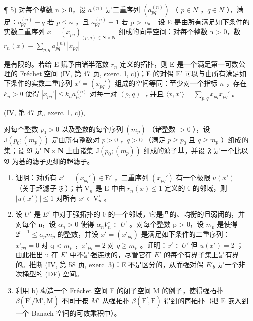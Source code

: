 ¶ 5) 对每个整数 n \textgreater{} 0，设 \(a^{(n)}\) 是二重序列 \((a_{pq}^{(n)})\) （ \(p \in N\) ，\(q \in N\) ），满足：\(a_{pq}^{(n)} = q\) 若 \(p \leqslant n\) ，且 \(a_{pq}^{(n)} = 1\) 若 p \textgreater{} n。~设 E 是由所有满足如下条件的实数二重序列 \(x = (x_{pq})_{(p,q) \in \mathbf{N} \times \mathbf{N}}\) 组成的向量空间：对每个整数 n \textgreater{} 0，数 \(r_n(x) = \sum_{p,q} a_{pq}^{(n)} |x_{pq}|\)

是有限的。若给 E 赋予由诸半范数 \(r_n\) 定义的拓扑，则 E 是一个满足第一可数公理的 Fréchet 空间 (IV, 第 47 页, exerc. 1, c))；E 的对偶 E' 可以与由所有满足如下条件的实数二重序列 \(x' = (x_{pq}')\) 组成的空间等同：至少对一个指标 \(n\) ，存在 \(k_n > 0\) 使得 \(|x_{pq}'| \leqslant k_n a_{pq}^{(n)}\) 对每一对 \((p, q)\) ；并且 \(\langle x, x' \rangle = \sum_{p, q} x_{pq} x_{pq}'\) 。

(IV, 第 47 页, exerc. 1, c))。

对每个整数 \(p_0 > 0\) 以及整数的每个序列 \((m_p)\) （诸整数 \(> 0\) ），设 \(\mathrm{J}(p_0; (m_p))\) 是由所有整数对 \(p > 0\) ，\(q > 0\) （满足 \(p \geqslant p_0\) 且 \(q \geqslant m_p\) ）组成的集；设 \(\mathfrak{V}\) 是 \(\mathbf{N} \times \mathbf{N}\) 上由诸集 \(\mathrm{J}(p_0; (m_p))\) 组成的滤子基，并设 \(\mathfrak{F}\) 是一个比以 \(\mathfrak{V}\) 为基的滤子更细的超滤子。

\begin{enumerate}
\def\labelenumi{\alph{enumi})}
\item
  证明：对所有 \(x' = (x_{pq}') \in \mathrm{E}'\) ，二重序列 \((x_{pq}')\) 有一个极限 \(u(x')\) （关于超滤子 \(\mathfrak{F}\) ）；若 \(\mathrm{V}_n\) 是 \(\mathrm{E}\) 中由 \(r_n(x) \leqslant 1\) 定义的 0 的邻域，则 \(|u(x')| \leqslant 1\) 对所有 \(x' \in \mathrm{V}_n^\circ\) 。
\item
  设 \(U'\) 是 \(E'\) 中对于强拓扑的 0 的一个邻域，它是凸的、均衡的且弱闭的，并对每个 n，设 \(\alpha_{n} > 0\) 使得 \(\alpha_{n} V_{n}^{\circ} \subset U'\) 。对每个整数 p \textgreater{} 0，设 \(m_{p}\) 是使得 \(2^{p+1} \leqslant \alpha_{p} m_{p}\) 的整数，并设 \(x' = (x'_{pq})\) 是满足如下条件的二重序列：\(x'_{pq} = 0\) 对 q \textless{} \(m_{p}\) ，\(x'_{pq} = 2\) 对 \(q \geqslant m_{p}\) 。证明：\(x' \in U'\) 但 \(u(x') = 2\) ；由此推出 u 在 \(E'\) 中不是强连续的，尽管它在 \(E'\) 的每个有界子集上是有界的。推断 (IV, 第 58 页, exerc. 3)：E 不是区分的，从而强对偶 \(E'_{b}\) 是一个非次桶型的 (DF) 空间。
\item
  利用 b) 构造一个 Fréchet 空间 F 的闭子空间 M 的例子，使得强拓扑 \(\beta(\mathrm{F}^{\prime}/\mathrm{M}^{\circ}, \mathrm{M})\) 不同于按 \(M^{\circ}\) 从强拓扑 \(\beta(\mathrm{F}^{\prime}, \mathrm{F})\) 得到的商拓扑（把 E 嵌入到一个 Banach 空间的可数乘积中）。
\end{enumerate}

